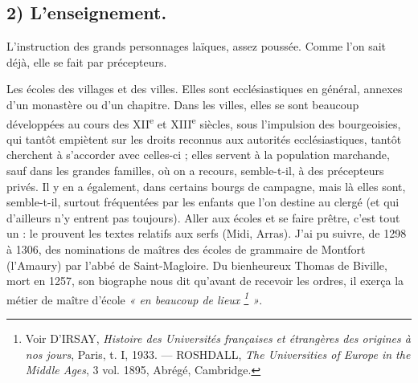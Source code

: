 \documentclass[french,twoside]{book} %
\newcommand\chapterclose{} %
\renewcommand\chapterclose{} %
\begin{document}
\subsection[2) L’enseignement.]{2) L’enseignement.}

\begin{listalpha}[itemsep=0pt,]
\item[] \hspace{-1.5em}{\bfseries Il faut distinguer soigneusement différents types :}
\item L’instruction des grands personnages laïques, assez poussée. Comme l’on sait déjà, elle se fait par précepteurs.
\item Les écoles des villages et des villes. Elles sont ecclésiastiques en général, annexes d’un monastère ou d’un chapitre. Dans les villes, elles se sont beaucoup développées au cours des XII\textsuperscript{e} et XIII\textsuperscript{e} siècles, sous l’impulsion des bourgeoisies, qui tantôt empiètent sur les droits reconnus aux autorités ecclésiastiques, tantôt cherchent à s’accorder avec celles-ci ; elles servent à la population marchande, sauf dans les grandes familles, où on a recours, semble-t-il, à des précepteurs privés. Il y en a également, dans certains bourgs de campagne, mais là elles sont, semble-t-il, surtout fréquentées par les enfants que l’on destine au clergé (et qui d’ailleurs n’y entrent pas toujours). Aller aux écoles et se faire prêtre, c’est tout un : le prouvent les textes relatifs aux serfs (Midi, Arras). J’ai pu suivre, de 1298 à 1306, des nominations de maîtres des écoles de grammaire de Montfort (l’Amaury) par l’abbé de Saint-Magloire. Du bienheureux Thomas de Biville, mort en 1257, son biographe nous dit qu’avant de recevoir les ordres, il exerça la métier de maître d’école \emph{« en beaucoup de lieux \footnote{ Voir D’IRSAY, {\itshape Histoire des Universités françaises et étrangères des origines à nos jours}, Paris, t. I, 1933. — ROSHDALL, {\itshape The Universities of Europe in the Middle Ages}, 3 vol. 1895, Abrégé, Cambridge.} »}.

\end{listalpha}\chapterclose
\end{document}
